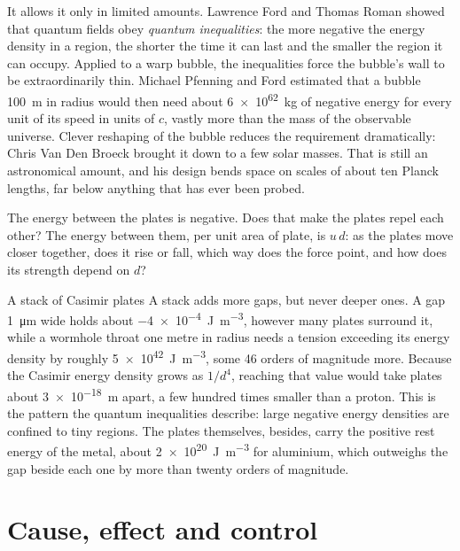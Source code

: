 It allows it only in limited amounts. Lawrence Ford and Thomas Roman showed
that quantum fields obey \emph{quantum inequalities}: the more negative the
energy density in a region, the shorter the time it can last and the smaller
the region it can occupy. Applied to a warp bubble, the inequalities force
the bubble's wall to be extraordinarily thin. Michael Pfenning and Ford
estimated that a bubble \SI{100}{\metre} in radius would then need about
\SI{6e62}{\kilogram} of negative energy for every unit of its speed in units
of $c$, vastly more than the mass of the observable universe. Clever
reshaping of the bubble reduces the requirement dramatically: Chris Van Den
Broeck brought it down to a few solar masses. That is still an astronomical
amount, and his design bends space on scales of about ten Planck lengths, far
below anything that has ever been probed.

\begin{checkpoint}[label=chk:casimir-force]
The energy between the plates is negative. Does that make the plates repel
each other? The energy between them, per unit area of plate, is $u\,d$: as the
plates move closer together, does it rise or fall, which way does the force
point, and how does its strength depend on $d$?
\end{checkpoint}

\begin{revisited}{A stack of Casimir plates}
A stack adds more gaps, but never deeper ones. A gap \SI{1}{\micro\metre} wide
holds about \SI{-4e-4}{\joule\per\cubic\metre}, however many plates surround
it, while a wormhole throat one metre in radius needs a tension exceeding its
energy density by roughly \SI{5e42}{\joule\per\cubic\metre}, some 46 orders of
magnitude more. Because the Casimir energy density grows as $1/d^{4}$,
reaching that value would take plates about \SI{3e-18}{\metre} apart, a few
hundred times smaller than a proton. This is the pattern the quantum
inequalities describe: large negative energy densities are confined to tiny
regions. The plates themselves, besides, carry the positive rest energy of the
metal, about \SI{2e20}{\joule\per\cubic\metre} for aluminium, which outweighs
the gap beside each one by more than twenty orders of magnitude.
\end{revisited}

\section{Cause, effect and control}\label{sec:causality}


